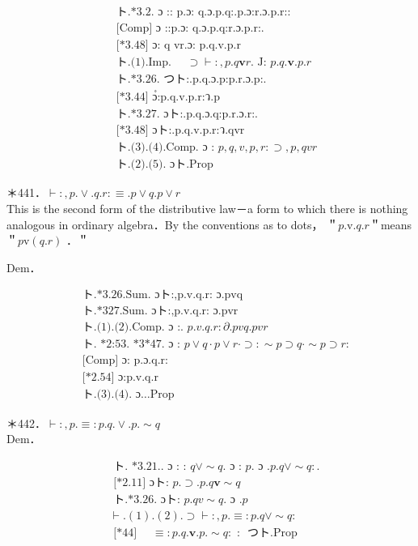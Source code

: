\documentclass[10pt]{article}
\begin{document}
\begin{align*}
& \text { ト.*3.2. ɔ :: p.ɔ: q.ɔ.p.q:.p.ɔ:r.ɔ.p.r:: } \\
& \text { [Comp] ɔ ::p.ɔ: q.ɔ.p.q:r.ɔ.p.r:. } \\
& \text { [*3.48] ɔ: q vr.ɔ: p.q.v.p.r }  \tag{1}\\
& \text { ト.(1).Imp. } \quad \supset \vdash:, p . q \mathbf{v} r . \text { J: } p . q . \mathbf{v} . p . r  \tag{2}\\
& \text { ト.*3.26. つト:.p.q.ɔ.p:p.r.ɔ.p:. } \\
& \text { [*3.44] ɔํ:p.q.v.p.r:ว.p }  \tag{3}\\
& \text { ト.*3.27. ɔト:.p.q.ɔ.q:p.r.ɔ.r:. } \\
& \text { [*3.48] ɔト:.p.q.v.p.r:ว.qvr }  \tag{4}\\
& \text { ト.(3).(4).Comp. ɔ : } p, q, v, p, r: \supset, p, q v r  \tag{5}\\
& \text { ト.(2).(5). ɔト.Prop }
\end{align*}


＊441．$\vdash:, p . \vee . q . r: \equiv . p \vee q . p \vee r$\\
This is the second form of the distributive law－a form to which there is nothing analogous in ordinary algebra．By the conventions as to dots， ＂$p . \mathrm{v} . q . r$＂means＂$p \mathrm{v}(q . r)$ ．＂

Dem．


\begin{align*}
& \text { ト.*3.26.Sum. ɔト:,p.v.q.r: ɔ.pvq }  \tag{1}\\
& \text { ト.*327.Sum. ɔト:,p.v.q.r: ɔ.pvr }  \tag{2}\\
& \text { ト.(1).(2).Comp. ɔ :. } p . v . q . r: \partial . p v q . p v r  \tag{3}\\
& \text { ト. *2:53. *3*47. ɔ : } p \vee q \cdot p \vee r \cdot \supset: \sim p \supset q \cdot \sim p \supset r: \\
& \text { [Comp] ɔ:~p.ɔ.q.r: } \\
& \text { [*2.54] ɔ:p.v.q.r }  \tag{4}\\
& \text { ト.(3).(4). ɔ…Prop }
\end{align*}


＊442．$\vdash:, p . \equiv: p . q . \vee . p . \sim q$\\
Dem．


\begin{align*}
& \text { ト. *3.21.. ɔ : : } q \vee \sim q . \text { ɔ : } p . \text { ɔ } . p . q \vee \sim q: . \\
& \text { [*2.11] ɔト: } p . \supset . p . q \mathbf{v} \sim q  \tag{1}\\
& \text { ト.*3.26. ɔト: } p . q v \sim q . \text { ɔ } . p  \tag{2}\\
& \vdash .(1) .(2) . \supset \vdash:, p . \equiv: p . q \vee \sim q: \\
& \text { [*44] } \quad \equiv: p . q . \mathbf{v} . p . \sim q: \text { : } \text { つト.Prop }
\end{align*}
\end{document}
